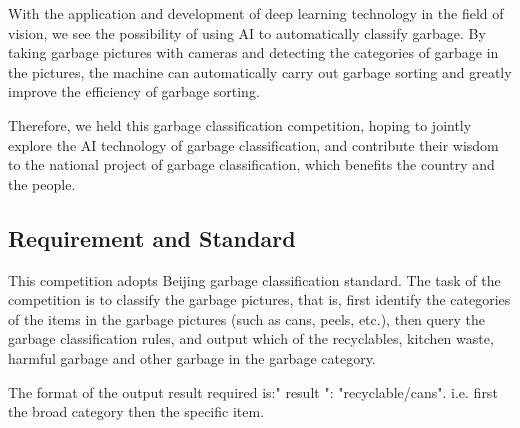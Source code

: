 With the application and development of deep learning technology in the field of vision, we see the possibility of using AI to automatically classify garbage. By taking garbage pictures with cameras and detecting the categories of garbage in the pictures, the machine can automatically carry out garbage sorting and greatly improve the efficiency of garbage sorting.

Therefore, we held this garbage classification competition, hoping to jointly explore the AI technology of garbage classification, and contribute their wisdom to the national project of garbage classification, which benefits the country and the people.

\subsection{Requirement and Standard}

This competition adopts Beijing garbage classification standard. The task of the competition is to classify the garbage pictures, that is, first identify the categories of the items in the garbage pictures (such as cans, peels, etc.), then query the garbage classification rules, and output which of the recyclables, kitchen waste, harmful garbage and other garbage in the garbage category.

The format of the output result required is:" result ": "recyclable/cans". i.e. first the broad category then the specific item.

